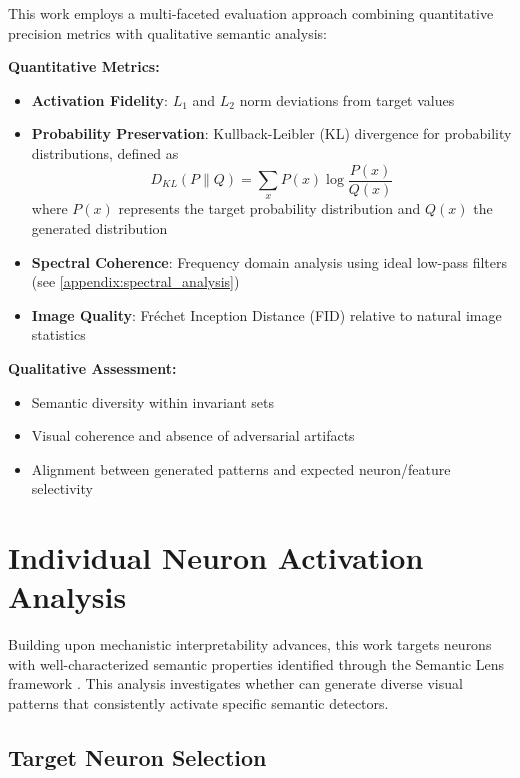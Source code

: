 This work employs a multi-faceted evaluation approach combining quantitative precision metrics with qualitative semantic analysis:

\textbf{Quantitative Metrics:}
\begin{itemize}
\item \textbf{Activation Fidelity}: $L_1$ and $L_2$ norm deviations from target values
\item \textbf{Probability Preservation}: Kullback-Leibler (KL) divergence for probability distributions, defined as
\begin{equation}
D_{KL}(P \parallel Q) = \sum_{x} P(x) \log \frac{P(x)}{Q(x)}
\end{equation}
where $P(x)$ represents the target probability distribution and $Q(x)$ the generated distribution
\item \textbf{Spectral Coherence}: Frequency domain analysis using ideal low-pass filters (see \cref{appendix:spectral_analysis})
\item \textbf{Image Quality}: Fréchet Inception Distance (FID) relative to natural image statistics
\end{itemize}

\textbf{Qualitative Assessment:}
\begin{itemize}
\item Semantic diversity within invariant sets
\item Visual coherence and absence of adversarial artifacts
\item Alignment between generated patterns and expected neuron/feature selectivity
\end{itemize}

\section{Individual Neuron Activation Analysis}

Building upon mechanistic interpretability advances, this work targets neurons with well-characterized semantic properties identified through the Semantic Lens framework \citep{dreyer2025mechanisticunderstandingvalidationlarge}. This analysis investigates whether \method{} can generate diverse visual patterns that consistently activate specific semantic detectors.

\subsection{Target Neuron Selection}

